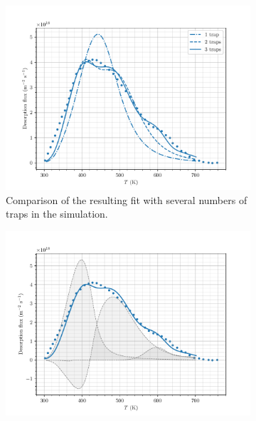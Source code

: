\begin{figure} [ht]
    \centering
        \begin{subfigure}[t]{0.5\linewidth}
            \centering
            \captionsetup{width=.9\linewidth}
            \includegraphics[width=\linewidth]{Figures/Chapter3/Parametric_optimisation/number_of_traps.pdf}
            \caption{Comparison of the resulting fit with several numbers of traps in the simulation.}
            \label{fig:number of traps comparison}
        \end{subfigure}%
        \begin{subfigure}[t]{0.5\linewidth}
            \centering
            \captionsetup{width=.9\linewidth}
            \includegraphics[width=\linewidth]{Figures/Chapter3/Parametric_optimisation/Ogorodnikova_5D.pdf}

\end{subfigure}
\end{figure}
